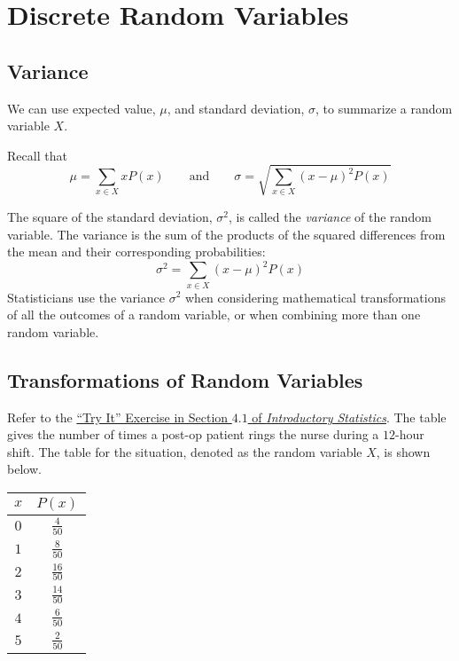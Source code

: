\setcounter{chapter}{3}
\chapter[Discrete Random Vars.]{Discrete Random Variables}

\section{Variance}

We can use expected value, \( \mu \), and standard deviation, \( \sigma \), to summarize a random variable \(X\). 

Recall that 
\[ \mu = \sum_{x \in X} x P(x)  
\qquad \text{and} \qquad
\sigma = \sqrt{ \sum_{x \in X} (x - \mu)^2 P(x) }\]

The square of the standard deviation, \( \sigma^2 \), is called the \emph{variance} of the random variable. The variance is the sum of the products of the squared differences from the mean and their corresponding probabilities:
\[ \sigma^2 = \sum_{x \in X} (x - \mu)^2 P(x)  \]
Statisticians use the variance \(\sigma^2\) when considering mathematical transformations of all the outcomes of a random variable, or when combining more than one random variable.


\section[Transformations]{Transformations of Random Variables}

Refer to the \href{http://cnx.org/contents/MBiUQmmY@18.10:X8iM07Af@4/Probability-Distribution-Funct}{``Try It'' Exercise in Section \(4.1\) of \emph{Introductory Statistics}}. The table gives the number of times a post-op patient rings the nurse during a \(12\)-hour shift. The table for the situation, denoted as the random variable \(X\), is shown below. 

\begin{center}
\begin{tabular}{c|c}
\(x\)	&	\(P(x)\)	\\ \hline \hline
\(0\)	&	\(\tfrac{4}{50}\)	\\ \hline 
\(1\)	&	\(\tfrac{8}{50}\)	\\ \hline
\(2\)	&	\(\tfrac{16}{50}\)	\\ \hline
\(3\)	&	\(\tfrac{14}{50}\)	\\ \hline
\(4\)	&	\(\tfrac{6}{50}\)	\\ \hline
\(5\)	&	\(\tfrac{2}{50}\)	\\ 
\end{tabular}
\end{center}

